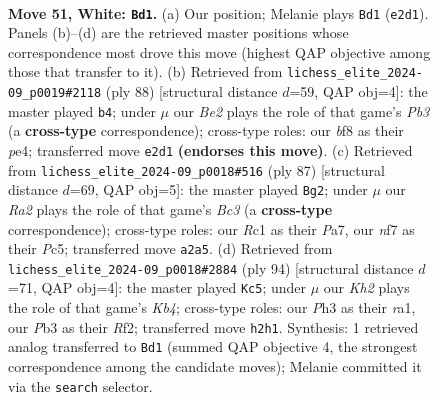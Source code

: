 \documentclass[11pt]{article}
\begin{document}
\clearpage

\begin{figure}[p]\centering
\begin{subfigure}{0.46\textwidth}\centering
\resizebox{\linewidth}{!}{%
\newchessgame
\chessboard[
  setfen={5b1r/p4n1p/P4k2/3r4/5B2/1Pp4P/R1P1B1PK/2R5 w - - 9 51},
  showmover=false,
  pgfstyle=straightmove, color=movearrow, markmove={e2-d1}
]}
\caption{}
\end{subfigure}\hfill
\begin{subfigure}{0.46\textwidth}\centering
\resizebox{\linewidth}{!}{%
\newchessgame
\chessboard[
  setfen={1r6/7p/2n1k3/p1B3RP/4p3/PP4P1/4PPK1/8 w - - 9 45},
  showmover=false,
  pgfstyle=straightmove, color=movearrow, markmove={b3-b4}
]}
\caption{}
\end{subfigure}
\\[4pt]
\begin{subfigure}{0.46\textwidth}\centering
\resizebox{\linewidth}{!}{%
\newchessgame
\chessboard[
  setfen={8/p5k1/1pb3p1/2p3N1/2Pb1P1K/1r6/8/4RR2 b - - 12 44},
  showmover=false,
  pgfstyle=straightmove, color=movearrow, markmove={c6-g2}
]}
\caption{}
\end{subfigure}\hfill
\begin{subfigure}{0.46\textwidth}\centering
\resizebox{\linewidth}{!}{%
\newchessgame
\chessboard[
  setfen={8/8/1Bp2k2/P3p2b/1KP2p1p/1P3P2/5R1P/r7 w - - 1 48},
  showmover=false,
  pgfstyle=straightmove, color=movearrow, markmove={b4-c5}
]}
\caption{}
\end{subfigure}
\caption{\textbf{Move 51, White: \texttt{Bd1}.} (a) Our position; Melanie plays \texttt{Bd1} (\texttt{e2d1}). Panels (b)--(d) are the retrieved master positions whose correspondence most drove this move (highest QAP objective among those that transfer to it). (b) Retrieved from \texttt{lichess\_elite\_2024-09\_p0019\#2118} (ply 88) [structural distance $d$=59, QAP obj=4]: the master played \texttt{b4}; under $\mu$ our \emph{Be2} plays the role of that game's \emph{Pb3} (a \textbf{cross-type} correspondence); cross-type roles: our \emph{b}f8 as their \emph{p}e4; transferred move \texttt{e2d1} \textbf{(endorses this move)}. (c) Retrieved from \texttt{lichess\_elite\_2024-09\_p0018\#516} (ply 87) [structural distance $d$=69, QAP obj=5]: the master played \texttt{Bg2}; under $\mu$ our \emph{Ra2} plays the role of that game's \emph{Bc3} (a \textbf{cross-type} correspondence); cross-type roles: our \emph{R}c1 as their \emph{P}a7, our \emph{n}f7 as their \emph{P}c5; transferred move \texttt{a2a5}. (d) Retrieved from \texttt{lichess\_elite\_2024-09\_p0018\#2884} (ply 94) [structural distance $d$=71, QAP obj=4]: the master played \texttt{Kc5}; under $\mu$ our \emph{Kh2} plays the role of that game's \emph{Kb4}; cross-type roles: our \emph{P}h3 as their \emph{r}a1, our \emph{P}b3 as their \emph{R}f2; transferred move \texttt{h2h1}. Synthesis: 1 retrieved analog transferred to \texttt{Bd1} (summed QAP objective 4, the strongest correspondence among the candidate moves); Melanie committed it via the \texttt{search} selector.}
\label{fig:thought-m100}
\end{figure}
\end{document}
